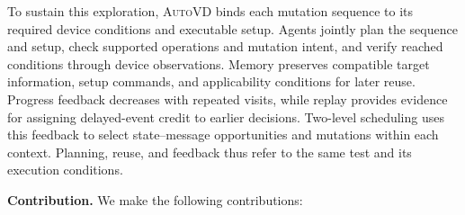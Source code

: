 \documentclass[10pt,journal,compsoc]{IEEEtran}
\newcommand{\system}{\textsc{AutoVD}}
\begin{document}
To sustain this exploration, \system{} binds each mutation sequence to its required device conditions and executable setup. Agents jointly plan the sequence and setup, check supported operations and mutation intent, and verify reached conditions through device observations. Memory preserves compatible target information, setup commands, and applicability conditions for later reuse. Progress feedback decreases with repeated visits, while replay provides evidence for assigning delayed-event credit to earlier decisions. Two-level scheduling uses this feedback to select state--message opportunities and mutations within each context. Planning, reuse, and feedback thus refer to the same test and its execution conditions.  \vspace{0.1cm}

\textbf{Contribution.} We make the following contributions:
\end{document}
